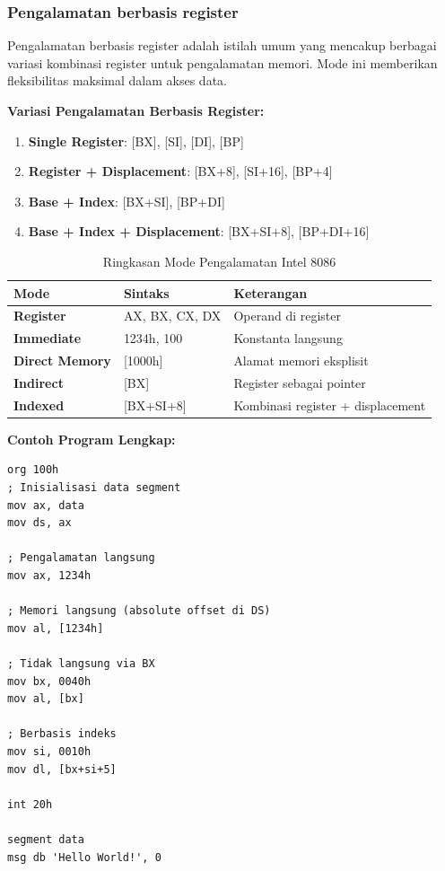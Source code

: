 \subsubsection{Pengalamatan berbasis register}
Pengalamatan berbasis register adalah istilah umum yang mencakup berbagai variasi kombinasi register untuk pengalamatan memori. Mode ini memberikan fleksibilitas maksimal dalam akses data.

\textbf{Variasi Pengalamatan Berbasis Register:}
\begin{enumerate}
    \item \textbf{Single Register}: [BX], [SI], [DI], [BP]
    \item \textbf{Register + Displacement}: [BX+8], [SI+16], [BP+4]
    \item \textbf{Base + Index}: [BX+SI], [BP+DI]
    \item \textbf{Base + Index + Displacement}: [BX+SI+8], [BP+DI+16]
\end{enumerate}

\begin{table}[h]
\centering
\caption{Ringkasan Mode Pengalamatan Intel 8086}
\begin{tabular}{|p{3cm}|p{4cm}|p{8cm}|}
\hline
\textbf{Mode} & \textbf{Sintaks} & \textbf{Keterangan} \\
\hline
\textbf{Register} & AX, BX, CX, DX & Operand di register \\
\hline
\textbf{Immediate} & 1234h, 100 & Konstanta langsung \\
\hline
\textbf{Direct Memory} & [1000h] & Alamat memori eksplisit \\
\hline
\textbf{Indirect} & [BX] & Register sebagai pointer \\
\hline
\textbf{Indexed} & [BX+SI+8] & Kombinasi register + displacement \\
\hline
\end{tabular}
\label{tab:addressing-modes-summary}
\end{table}

\textbf{Contoh Program Lengkap:}
\begin{lstlisting}[language={[x86masm]Assembler}, caption=Program Lengkap dengan Berbagai Mode Pengalamatan, label=lst:complete-program]
org 100h
; Inisialisasi data segment
mov ax, data
mov ds, ax

; Pengalamatan langsung
mov ax, 1234h

; Memori langsung (absolute offset di DS)
mov al, [1234h]

; Tidak langsung via BX
mov bx, 0040h
mov al, [bx]

; Berbasis indeks
mov si, 0010h
mov dl, [bx+si+5]

int 20h

segment data
msg db 'Hello World!', 0
\end{lstlisting}

